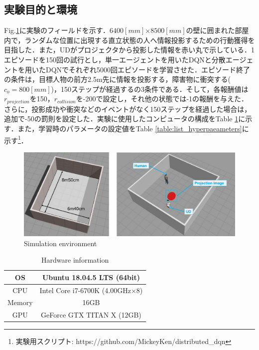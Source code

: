 \documentclass[12pt]{sonota/aislab}
\begin{document}
\subsection{実験目的と環境}
Fig.\ref{gazebo}に実験のフィールドを示す．$6400[mm]$×$8500[mm]$の壁に囲まれた部屋内で，ランダムな位置に出現する直立状態の人へ情報投影するための行動獲得を目指した．また，UDがプロジェクタから投影した情報を赤い丸で示している．1エピソードを150回の試行とし，単一エージェントを用いたDQNと分散エージェントを用いたDQNでそれぞれ5000回エピソードを学習させた．エピソード終了の条件は，目標人物の前方2.5m先に情報を投影する，障害物に衝突する($c_{o}=800[mm]$)，150ステップが経過するの3条件である．そして，各報酬値は$r_{projection}$を150，$r_{collision}$を-200で設定し，それ他の状態では-1の報酬を与えた．さらに，投影成功や衝突などのイベントがなく150ステップを経過した場合は，追加で-50の罰則を設定した．実験に使用したコンピュータの構成をTable \ref{table:conmupter_experiment}に示す．また，学習時のパラメータの設定値をTable \ref{table:list_hyperpaeameters}に示す\footnote{実験用スクリプト: https://github.com/MickeyKen/distributed\_dqn}．


\begin{figure}[t]
\begin{center}
\includegraphics[clip, width=12cm]{figs/experiment_environment.eps}
\caption{Simulation environment}
\label{gazebo}
\end{center}
\end{figure}

\begin{table}[t]
	\caption{Hardware information}
	\label{table:conmupter_experiment}
	\centering 
	\begin{tabular}[tbp]{|c|c|}
		\hline 
		OS & Ubuntu 18.04.5 LTS (64bit) \\\hline
		CPU & Intel Core i7-6700K (4.00GHz$\times$8) \\\hline
		Memory & 16GB \\\hline
		GPU & GeForce GTX TITAN X (12GB) \\\hline
	\end{tabular}
\end{table}
\end{document}

